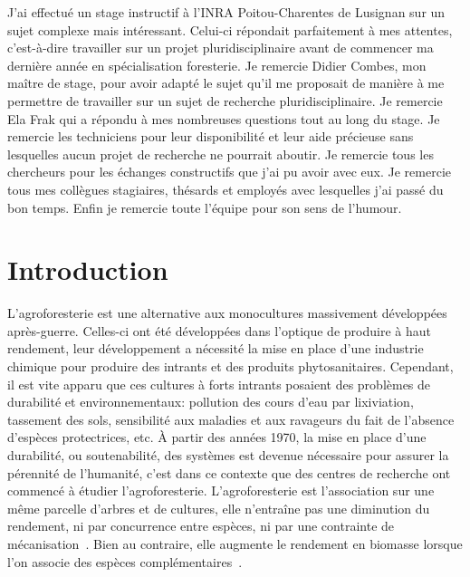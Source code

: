 \documentclass[12pt]{report}
\begin{document}
J'ai effectué un stage instructif à l'INRA Poitou-Charentes de Lusignan sur un
sujet complexe mais intéressant. Celui-ci répondait parfaitement à mes attentes,
c'est-à-dire travailler sur un projet pluridisciplinaire avant de commencer ma
dernière année en spécialisation foresterie. Je remercie Didier Combes, mon
maître de stage, pour avoir adapté le sujet qu'il me proposait de manière à me
permettre de travailler sur un sujet de recherche pluridisciplinaire. Je
remercie Ela Frak qui a répondu à mes nombreuses questions tout au long du stage.
Je remercie les techniciens pour leur disponibilité et leur aide précieuse sans
lesquelles aucun projet de recherche ne pourrait aboutir. Je remercie tous les chercheurs pour
les échanges constructifs que j'ai pu avoir avec eux. Je remercie tous mes
collègues stagiaires, thésards et employés avec lesquelles j'ai passé du bon
temps. Enfin je remercie toute l'équipe pour son sens de l'humour.

\chapter{Introduction}

L'agroforesterie est une alternative aux monocultures massivement développées
après-guerre. Celles-ci ont été développées dans l'optique de produire à
haut rendement, leur développement a nécessité la mise en place d'une
industrie chimique pour produire des intrants et des produits phytosanitaires.
Cependant, il est vite apparu que ces cultures à forts intrants posaient des
problèmes de durabilité et environnementaux: pollution des cours d'eau par
lixiviation, tassement des sols, sensibilité aux maladies et aux
ravageurs du fait de l'absence d'espèces protectrices, etc. À partir des années
1970, la mise en place d'une durabilité, ou soutenabilité, des systèmes est devenue
nécessaire pour assurer la pérennité de l'humanité, c'est dans ce contexte que des
centres de recherche ont commencé à étudier l'agroforesterie.
L'agroforesterie est l'association sur une même parcelle d'arbres et de cultures,
elle n'entraîne pas une diminution du rendement, ni par concurrence entre espèces,
ni par une contrainte de mécanisation~\citep{AF_ref50}. Bien au contraire, elle
augmente le rendement en biomasse lorsque l'on associe des espèces
complémentaires~\citep{AF_ref51}.
\end{document}

